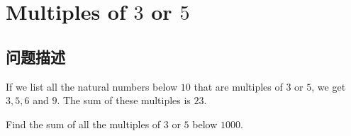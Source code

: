 \chapter{Multiples of $3$ or $5$}
\section{问题描述}
\begin{tcolorbox}
If we list all the natural numbers below $10$ that are multiples of $3$ or $5$, we get $3, 5, 6$ and $9$. The sum of these multiples is $23$.

Find the sum of all the multiples of $3$ or $5$ below $1000$.
\end{tcolorbox}
